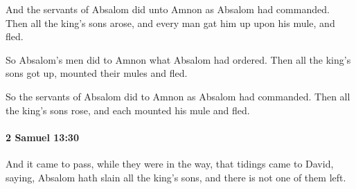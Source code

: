 			\begin{versebox}
					\item[BHS] 
					\item[ASV] And the servants of Absalom did unto Amnon as Absalom had commanded. Then all the king's sons arose, and every man gat him up upon his mule, and fled.
					\item[NIV] So Absalom’s men did to Amnon what Absalom had ordered. Then all the king’s sons got up, mounted their mules and fled.
					\item[NRSV] So the servants of Absalom did to Amnon as Absalom had commanded. Then all the king’s sons rose, and each mounted his mule and fled.
			\end{versebox}

		\paragraph{2 Samuel 13:30} %
			\label{2SAMUEL-13-30}

			And it came to pass, while they were in the way, that tidings came to David, saying, Absalom hath slain all the king’s sons, and there is not one of them left.

